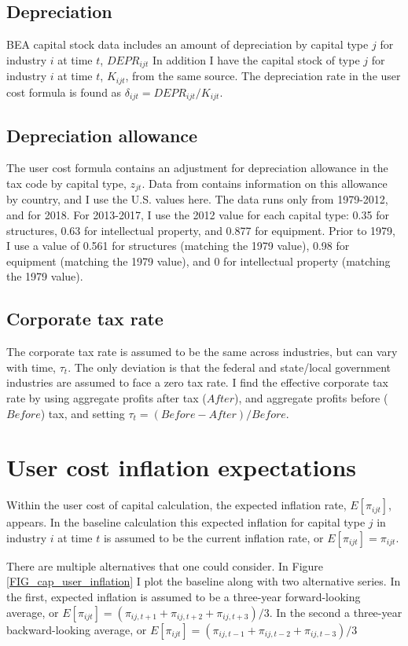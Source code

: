 \documentclass[11pt]{article}
\begin{document}
\subsection{Depreciation}
BEA capital stock data \citep{beacap} includes an amount of depreciation by capital type $j$ for industry $i$ at time $t$, $DEPR_{ijt}$ In addition I have the capital stock of type $j$ for industry $i$ at time $t$, $K_{ijt}$, from the same source. The depreciation rate in the user cost formula is found as $\delta_{ijt} = DEPR_{ijt}/K_{ijt}$.

\subsection{Depreciation allowance}
The user cost formula contains an adjustment for depreciation allowance in the tax code by capital type, $z_{jt}$. Data from \cite{stan} contains information on this allowance by country, and I use the U.S. values here. The data runs only from 1979-2012, and for 2018. For 2013-2017, I use the 2012 value for each capital type: 0.35 for structures, 0.63 for intellectual property, and 0.877 for equipment. Prior to 1979, I use a value of 0.561 for structures (matching the 1979 value), 0.98 for equipment (matching the 1979 value), and 0 for intellectual property (matching the 1979 value). 

\subsection{Corporate tax rate}
The corporate tax rate is assumed to be the same across industries, but can vary with time, $\tau_t$. The only deviation is that the federal and state/local government industries are assumed to face a zero tax rate. I find the effective corporate tax rate by using aggregate profits after tax ($After$), and aggregate profits before ($Before$) tax, and setting $\tau_t = (Before - After)/Before$. 

\section{User cost inflation expectations}
Within the user cost of capital calculation, the expected inflation rate, $E[\pi_{ijt}]$, appears. In the baseline calculation this expected inflation for capital type $j$ in industry $i$ at time $t$ is assumed to be the current inflation rate, or $E[\pi_{ijt}] = \pi_{ijt}$. 

There are multiple alternatives that one could consider. In Figure \ref{FIG_cap_user_inflation} I plot the baseline along with two alternative series. In the first, expected inflation is assumed to be a three-year forward-looking average, or $E[\pi_{ijt}] = (\pi_{ij,t+1} + \pi_{ij,t+2} + \pi_{ij,t+3})/3$. In the second a three-year backward-looking average, or $E[\pi_{ijt}] = (\pi_{ij,t-1} + \pi_{ij,t-2} + \pi_{ij,t-3})/3$
\end{document}
